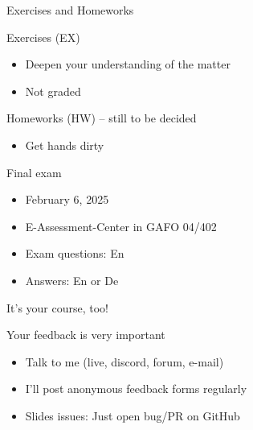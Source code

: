 \documentclass[12pt,aspectratio=169,handout]{beamer}
\begin{document}
\begin{frame}{Exercises and Homeworks}
	
Exercises (EX)

\begin{itemize}
	\item Deepen your understanding of the matter
	\item Not graded
\end{itemize}

Homeworks (HW) -- still to be decided

\begin{itemize}
	\item Get hands dirty
\end{itemize}

\end{frame}

\begin{frame}{Final exam}
	
	
\begin{itemize}
\item February 6, 2025
\item E-Assessment-Center in GAFO 04/402
\item Exam questions: En
\item Answers: En or De
\end{itemize}

\end{frame}



\begin{frame}{It's your course, too!}
	
Your feedback is very important

\begin{itemize}
	\item Talk to me (live, discord, forum, e-mail)
	\item I'll post anonymous feedback forms regularly
	\item Slides issues: Just open bug/PR on GitHub
\end{itemize}


\end{frame}
\end{document}
